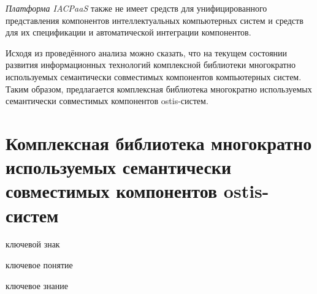 \textit{Платформа IACPaaS} также не имеет средств для унифицированного представления компонентов интеллектуальных компьютерных систем и средств для их спецификации и автоматической интеграции компонентов.

Исходя из проведённого анализа можно сказать, что на текущем состоянии развития информационных технологий  комплексной библиотеки многократно используемых семантически совместимых компонентов компьютерных систем. Таким образом, предлагается комплексная библиотека многократно используемых семантически совместимых компонентов ostis-систем.

\section{Комплексная библиотека многократно используемых семантически совместимых компонентов ostis-систем}
\label{ostis_library_section}

\begin{SCn}
\begin{scnrelfromlist}{ключевой знак}
\end{scnrelfromlist}
\end{SCn}

\begin{SCn}
\begin{scnrelfromlist}{ключевое понятие}
\end{scnrelfromlist}
\end{SCn}

\begin{SCn}
\begin{scnrelfromlist}{ключевое знание}
\end{scnrelfromlist}
\end{SCn}

\bigskip

